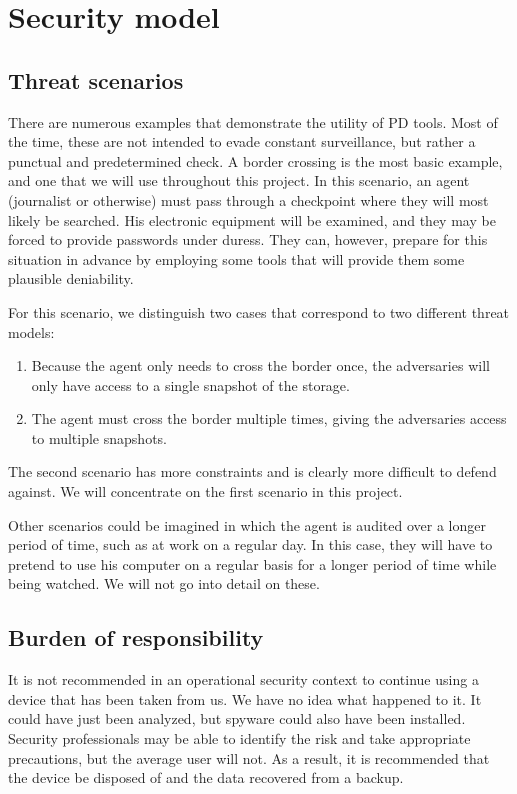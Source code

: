 \documentclass[a4paper,11pt,oneside]{report}
\begin{document}
\newpage
\let\clearpage\relax

\chapter{Security model}

\section{Threat scenarios}

There are numerous examples that demonstrate the utility of PD tools. Most of the time, these are not intended to evade constant surveillance, but rather a punctual and predetermined check. A border crossing is the most basic example, and one that we will use throughout this project. In this scenario, an agent (journalist or otherwise) must pass through a checkpoint where they will most likely be searched. His electronic equipment will be examined, and they may be forced to provide passwords under duress. They can, however, prepare for this situation in advance by employing some tools that will provide them some plausible deniability.

For this scenario, we distinguish two cases that correspond to two different threat models:
\begin{enumerate}
    \item Because the agent only needs to cross the border once, the adversaries will only have access to a single snapshot of the storage.
    \item The agent must cross the border multiple times, giving the adversaries access to multiple snapshots.
\end{enumerate}
The second scenario has more constraints and is clearly more difficult to defend against. We will concentrate on the first scenario in this project.

Other scenarios could be imagined in which the agent is audited over a longer period of time, such as at work on a regular day. In this case, they will have to pretend to use his computer on a regular basis for a longer period of time while being watched. We will not go into detail on these.

\section{Burden of responsibility}

It is not recommended in an operational security context to continue using a device that has been taken from us. We have no idea what happened to it. It could have just been analyzed, but spyware could also have been installed. Security professionals may be able to identify the risk and take appropriate precautions, but the average user will not. As a result, it is recommended that the device be disposed of and the data recovered from a backup.
\end{document}
